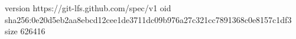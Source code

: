 version https://git-lfs.github.com/spec/v1
oid sha256:0e20d5eb2aa8ebcd12cee1de3711dc09b976a27c321cc7891368c0e8157c1df3
size 626416
